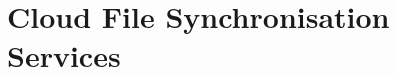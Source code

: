 \section{Cloud File Synchronisation Services}\label{sec:application:cloud_file_synchronisation}
\cite{Schwartz2014a}

\newcommand{\dropbox}{\emph{DropBox}\xspace}
\newcommand{\imageFileSize}{\ensuremath{S_I}\xspace}
\newcommand{\imageArrivalRate}{\ensuremath{\lambda_I}\xspace}
\newcommand{\panTransferRate}{\ensuremath{B_{P}}\xspace}
\newcommand{\interarrivaltime}{\ensuremath{t_I}\xspace}
\newcommand{\clientpreparationtime}{\ensuremath{C}\xspace}
\newcommand{\uploadbandwidth}{\ensuremath{B_U}\xspace}
\newcommand{\idleThreshold}{\ensuremath{\tau}\xspace}
\newcommand{\serverpreparationtime}{\ensuremath{S}\xspace}
\newcommand{\downloadbandwidth}{\ensuremath{B_D}\xspace}
\newcommand{\startupDelay}{\ensuremath{\sigma}\xspace}
\newcommand{\sojournTime}{\ensuremath{\Sigma}\xspace}
\newcommand{\relativeDisconnectedTime}{\ensuremath{\Delta}\xspace}
\newcommand{\connectionCount}{\ensuremath{K}\xspace}
\newcommand{\algointerval}{\emph{Interval}\xspace}
\newcommand{\algosize}{\emph{Size}\xspace}
\newcommand{\algoimmediate}{\emph{Immediate}\xspace}
\newcommand{\numberOfFiles}{\ensuremath{n}}






